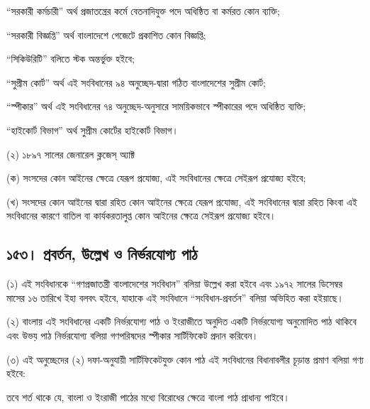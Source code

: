 \documentclass[11pt]{article}
\begin{document}
“সরকারী কর্মচারী” অর্থ প্রজাতন্ত্রের কর্মে বেতনাদিযুক্ত পদে অধিষ্ঠিত বা কর্মরত
কোন ব্যক্তি;

“সরকারী বিজ্ঞপ্তি” অর্থ বাংলাদেশে গেজেটে প্রকাশিত কোন বিজ্ঞপ্তি;

“সিকিউরিটি” বলিতে স্টক অন্তর্ভুক্ত হইবে;

“সুপ্রীম কোর্ট” অর্থ এই সংবিধানের ৯৪ অনুচ্ছেদ-দ্বারা গঠিত বাংলাদেশের সুপ্রীম
কোর্ট;

“স্পীকার” অর্থ এই সংবিধানের ৭৪ অনুচ্ছেদ-অনুসারে সাময়িকভাবে স্পীকারের পদে
অধিষ্ঠিত ব্যক্তি;

“হাইকোর্ট বিভাগ” অর্থ সুপ্রীম কোর্টের হাইকোর্ট বিভাগ।

(২) ১৮৯৭ সালের জেনারেল ক্লজেস্ অ্যাক্ট

(ক) সংসদের কোন আইনের ক্ষেত্রে যেরূপ প্রযোজ্য, এই সংবিধানের ক্ষেত্রে সেইরূপ
    প্রযোজ্য হইবে;

(খ) সংসদের কোন আইনের দ্বারা রহিত কোন আইনের ক্ষেত্রে যেরূপ প্রযোজ্য, এই
    সংবিধানের দ্বারা রহিত কিংবা এই সংবিধানের কারণে বাতিল বা কার্যকরতালুপ্ত কোন
    আইনের ক্ষেত্রে সেইরূপ প্রযোজ্য হইবে।

\subsection{১৫৩। প্রবর্তন, উল্লেখ ও নির্ভরযোগ্য পাঠ}
\label{sec:orgca792c1}
(১) এই সংবিধানকে “গণপ্রজাতন্ত্রী বাংলাদেশের সংবিধান” বলিয়া উল্লেখ করা হইবে
    এবং ১৯৭২ সালের ডিসেম্বর মাসের ১৬ তারিখে ইহা বলবৎ হইবে, যাহাকে এই
    সংবিধানে “সংবিধান-প্রবর্তন” বলিয়া অভিহিত করা হইয়াছে।

(২) বাংলায় এই সংবিধানের একটি নির্ভরযোগ্য পাঠ ও ইংরাজীতে অনুদিত একটি
    নির্ভরযোগ্য অনুমোদিত পাঠ থাকিবে এবং উভয় পাঠ নির্ভরযোগ্য বলিয়া গণপরিষদের
    স্পীকার সার্টিফিকেট প্রদান করিবেন।

(৩) এই অনুচ্ছেদের (২) দফা-অনুযায়ী সার্টিফিকেটযুক্ত কোন পাঠ এই সংবিধানের
    বিধানাবলীর চূড়ান্ত প্রমাণ বলিয়া গণ্য হইবে:

তবে শর্ত থাকে যে, বাংলা ও ইংরাজী পাঠের মধ্যে বিরোধের ক্ষেত্রে বাংলা পাঠ
প্রাধান্য পাইবে।
\end{document}
